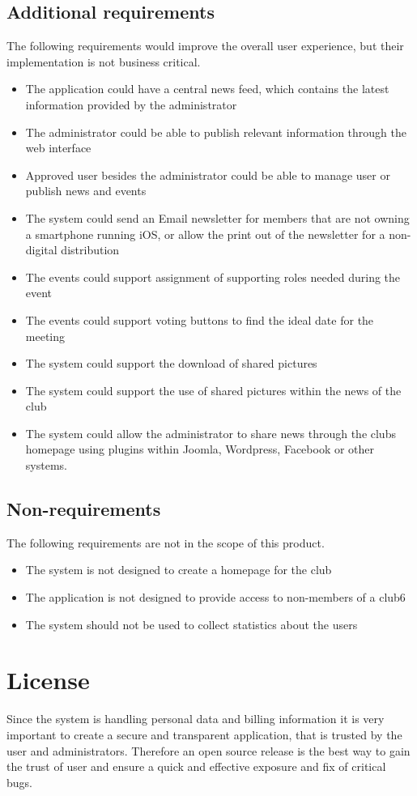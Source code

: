 \section{Additional requirements}
The following requirements would improve the overall user experience, but their implementation is not business critical.
\begin{itemize}
\item The application could have a central news feed, which contains the latest information provided by the administrator
\item The administrator could be able to publish relevant information through the web interface
\item Approved user besides the administrator could be able to manage user or publish news and events
\item The system could send an Email newsletter for members that are not owning a smartphone running iOS, or allow the print out of the newsletter for a non-digital distribution
\item The events could support assignment of supporting roles needed during the event
\item The events could support voting buttons to find the ideal date for the meeting
\item The system could support the download of shared pictures
\item The system could support the use of shared pictures within the news of the club
\item The system could allow the administrator to share news through the clubs homepage using plugins within Joomla, Wordpress, Facebook or other systems.
\end{itemize}

\section{Non-requirements} %
The following requirements are not in the scope of this product.
\begin{itemize}
\item The system is not designed to create a homepage for the club
\item The application is not designed to provide access to non-members of a club6
\item The system should not be used to collect statistics about the users
\end{itemize}

\chapter{License}
Since the system is handling personal data and billing information it is very important to create a secure and transparent application, that is trusted by the user and administrators. Therefore an open source release is the best way to gain the trust of user and ensure a quick and effective exposure and fix of critical bugs. 

